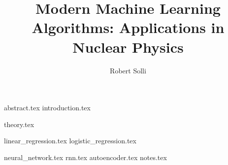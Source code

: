 \documentclass{uiofysmaster}
\author{Robert Solli}
\title{Modern Machine Learning Algorithms: Applications in Nuclear Physics}
\begin{document}
\maketitle


{abstract.tex}
{introduction.tex}

{theory.tex}

{linear_regression.tex}
{logistic_regression.tex}

{neural_network.tex}
{rnn.tex}
{autoencoder.tex}
{notes.tex}


% 


\end{document}
